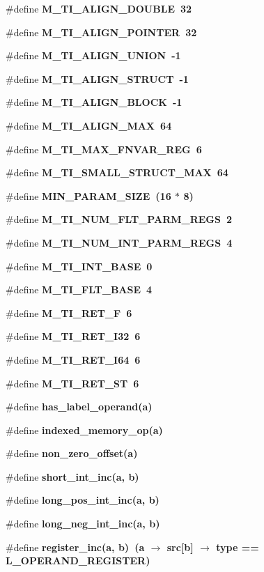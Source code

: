 \begin{CompactItemize}
\#define \bf{M\_\-TI\_\-ALIGN\_\-DOUBLE}~32
\item 
\#define \bf{M\_\-TI\_\-ALIGN\_\-POINTER}~32
\item 
\#define \bf{M\_\-TI\_\-ALIGN\_\-UNION}~-1
\item 
\#define \bf{M\_\-TI\_\-ALIGN\_\-STRUCT}~-1
\item 
\#define \bf{M\_\-TI\_\-ALIGN\_\-BLOCK}~-1
\item 
\#define \bf{M\_\-TI\_\-ALIGN\_\-MAX}~64
\item 
\#define \bf{M\_\-TI\_\-MAX\_\-FNVAR\_\-REG}~6
\item 
\#define \bf{M\_\-TI\_\-SMALL\_\-STRUCT\_\-MAX}~64
\item 
\#define \bf{MIN\_\-PARAM\_\-SIZE}~(16 $\ast$ 8)
\item 
\#define \bf{M\_\-TI\_\-NUM\_\-FLT\_\-PARM\_\-REGS}~2
\item 
\#define \bf{M\_\-TI\_\-NUM\_\-INT\_\-PARM\_\-REGS}~4
\item 
\#define \bf{M\_\-TI\_\-INT\_\-BASE}~0
\item 
\#define \bf{M\_\-TI\_\-FLT\_\-BASE}~4
\item 
\#define \bf{M\_\-TI\_\-RET\_\-F}~6
\item 
\#define \bf{M\_\-TI\_\-RET\_\-I32}~6
\item 
\#define \bf{M\_\-TI\_\-RET\_\-I64}~6
\item 
\#define \bf{M\_\-TI\_\-RET\_\-ST}~6
\item 
\#define \bf{has\_\-label\_\-operand}(a)
\item 
\#define \bf{indexed\_\-memory\_\-op}(a)
\item 
\#define \bf{non\_\-zero\_\-offset}(a)
\item 
\#define \bf{short\_\-int\_\-inc}(a, b)
\item 
\#define \bf{long\_\-pos\_\-int\_\-inc}(a, b)
\item 
\#define \bf{long\_\-neg\_\-int\_\-inc}(a, b)
\item 
\#define \bf{register\_\-inc}(a, b)~(a $\rightarrow$ src[b] $\rightarrow$ type == L\_\-OPERAND\_\-REGISTER)
\end{CompactItemize}
